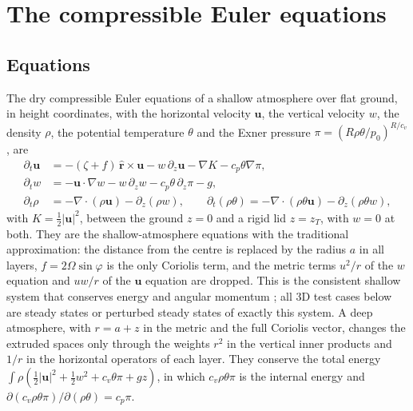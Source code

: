 \documentclass[preprint,12pt]{elsarticle}
\newcommand{\bu}{\mathbf{u}}
\newcommand{\rhat}{\hat{\mathbf{r}}}
\theoremstyle{definition}
\begin{document}
\section{The compressible Euler equations}\label{sec:3d}

\subsection{Equations}
The dry compressible Euler equations of a shallow atmosphere over flat ground, in height coordinates,
with the horizontal velocity $\bu$, the vertical velocity $w$, the density $\rho$, the potential
temperature $\theta$ and the Exner pressure $\pi = (R\rho\theta/p_0)^{R/c_v}$, are
\begin{align}
  \partial_t \bu &= -(\zeta + f)\,\rhat \times \bu - w\,\partial_z\bu - \nabla K - c_p\theta\nabla\pi, \\
  \partial_t w &= -\bu\cdot\nabla w - w\,\partial_z w - c_p\theta\,\partial_z\pi - g,\\
  \partial_t \rho &= -\nabla\cdot(\rho \bu) - \partial_z(\rho w), \qquad
  \partial_t(\rho\theta) = -\nabla\cdot(\rho\theta \bu) - \partial_z(\rho\theta w),
\end{align}
with $K = \tfrac12|\bu|^2$, between the ground $z = 0$ and a rigid lid $z = z_T$, with $w = 0$ at both.
They are the shallow-atmosphere equations with the traditional approximation: the distance from the centre
is replaced by the radius $a$ in all layers, $f = 2\Omega\sin\varphi$ is the only Coriolis term, and the
metric terms $u^2/r$ of the $w$ equation and $uw/r$ of the $\bu$ equation are dropped. This is the
consistent shallow system that conserves energy and angular momentum \cite{White2005}; all 3D test cases
below are steady states or perturbed steady states of exactly this system. A deep atmosphere, with
$r = a + z$ in the metric and the full Coriolis vector, changes the extruded spaces only through the
weights $r^2$ in the vertical inner products and $1/r$ in the horizontal operators of each layer. They
conserve the total energy
$\int\rho(\tfrac12|\bu|^2 + \tfrac12w^2 + c_v\theta\pi + gz)$, in which $c_v\rho\theta\pi$ is the internal
energy and $\partial(c_v\rho\theta\pi)/\partial(\rho\theta) = c_p\pi$.
\end{document}
